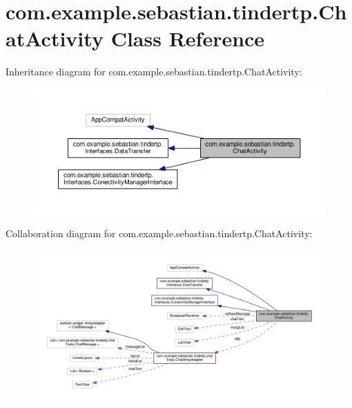 \hypertarget{classcom_1_1example_1_1sebastian_1_1tindertp_1_1ChatActivity}{}\section{com.\+example.\+sebastian.\+tindertp.\+Chat\+Activity Class Reference}
\label{classcom_1_1example_1_1sebastian_1_1tindertp_1_1ChatActivity}


Inheritance diagram for com.\+example.\+sebastian.\+tindertp.\+Chat\+Activity\+:
\nopagebreak
\begin{figure}[H]
\begin{center}
\leavevmode
\includegraphics[width=350pt]{classcom_1_1example_1_1sebastian_1_1tindertp_1_1ChatActivity__inherit__graph}
\end{center}
\end{figure}


Collaboration diagram for com.\+example.\+sebastian.\+tindertp.\+Chat\+Activity\+:
\nopagebreak
\begin{figure}[H]
\begin{center}
\leavevmode
\includegraphics[width=350pt]{classcom_1_1example_1_1sebastian_1_1tindertp_1_1ChatActivity__coll__graph}
\end{center}
\end{figure}
